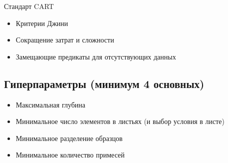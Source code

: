 Стандарт CART
\begin{itemize}
    \item Критерии Джини
    \item Сокращение затрат и сложности
    \item Замещающие предикаты для отсутствующих данных
\end{itemize}

\subsection{Гиперпараметры (минимум 4 основных)}

\begin{itemize}
    \item Максимальная глубина
    \item Минимальное число элементов в листьях (и выбор условия в листе)
    \item Минимальное разделение образцов
    \item Минимальное количество примесей
\end{itemize}